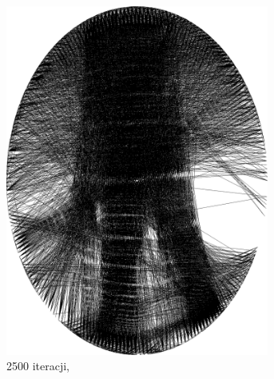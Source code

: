 \begin{figure}[htb]
\begin{subfigure}{0.20\textwidth}
            \includegraphics[width = 0.95\textwidth]{img/2-theory/aldrin/030mask-aldrin_ellipse_2500_threaded.png}
            \caption{2500 iteracji, }
            \label{theory-technics-mask-aldrin-threaded-m}
        \end{subfigure}
        \begin{subfigure}{0.19\textwidth}
            \centering

\end{subfigure}
\end{figure}
